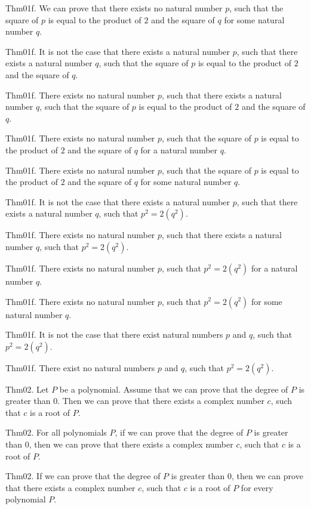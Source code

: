 \documentclass{article}
\begin{document}
Thm01f. We can prove that there exists no natural number $p$, such that the square of $p$ is equal to the product of $2$ and the square of $q$ for some natural number $q$.

Thm01f. It is not the case that there exists a natural number $p$, such that there exists a natural number $q$, such that the square of $p$ is equal to the product of $2$ and the square of $q$.

Thm01f. There exists no natural number $p$, such that there exists a natural number $q$, such that the square of $p$ is equal to the product of $2$ and the square of $q$.

Thm01f. There exists no natural number $p$, such that the square of $p$ is equal to the product of $2$ and the square of $q$ for a natural number $q$.

Thm01f. There exists no natural number $p$, such that the square of $p$ is equal to the product of $2$ and the square of $q$ for some natural number $q$.

Thm01f. It is not the case that there exists a natural number $p$, such that there exists a natural number $q$, such that $p ^{ 2}= 2 (q ^{ 2})$.

Thm01f. There exists no natural number $p$, such that there exists a natural number $q$, such that $p ^{ 2}= 2 (q ^{ 2})$.

Thm01f. There exists no natural number $p$, such that $p ^{ 2}= 2 (q ^{ 2})$ for a natural number $q$.

Thm01f. There exists no natural number $p$, such that $p ^{ 2}= 2 (q ^{ 2})$ for some natural number $q$.

Thm01f. It is not the case that there exist natural numbers $p$ and $q$, such that $p ^{ 2}= 2 (q ^{ 2})$.

Thm01f. There exist no natural numbers $p$ and $q$, such that $p ^{ 2}= 2 (q ^{ 2})$.

Thm02. Let $P$ be a polynomial. Assume that we can prove that the degree of $P$ is greater than $0$. Then we can prove that there exists a complex number $c$, such that $c$ is a root of $P$.

Thm02. For all polynomials $P$, if we can prove that the degree of $P$ is greater than $0$, then we can prove that there exists a complex number $c$, such that $c$ is a root of $P$.

Thm02. If we can prove that the degree of $P$ is greater than $0$, then we can prove that there exists a complex number $c$, such that $c$ is a root of $P$ for every polynomial $P$.
\end{document}
